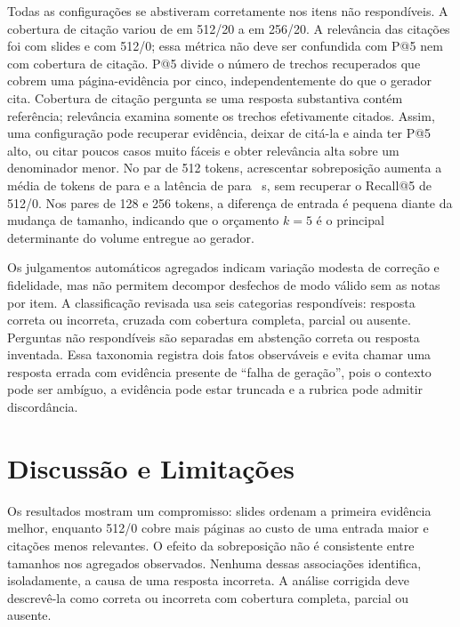 \documentclass[conference]{IEEEtran}
\begin{document}
Todas as configurações se abstiveram corretamente nos \NNaoRespondiveisTeste{} itens não respondíveis.
A cobertura de citação variou de \ComCitacaoCGrdCom{} em 512/20 a \ComCitacaoCMedCom{} em 256/20.
A relevância das citações foi \PrecCitacaoSlide{} com slides e \PrecCitacaoCGrdSem{} com 512/0; essa métrica não deve ser confundida com P@5 nem com cobertura de citação.
P@5 divide o número de trechos recuperados que cobrem uma página-evidência por cinco, independentemente do que o gerador cita.
Cobertura de citação pergunta se uma resposta substantiva contém referência; relevância examina somente os trechos efetivamente citados.
Assim, uma configuração pode recuperar evidência, deixar de citá-la e ainda ter P@5 alto, ou citar poucos casos muito fáceis e obter relevância alta sobre um denominador menor.
No par de 512 tokens, acrescentar sobreposição aumenta a média de tokens de \TokensEntradaCGrdSem{} para \TokensEntradaCGrdCom{} e a latência de \LatenciaGeracaoCGrdSem{} para \LatenciaGeracaoCGrdCom{}~s, sem recuperar o Recall@5 de 512/0.
Nos pares de 128 e 256 tokens, a diferença de entrada é pequena diante da mudança de tamanho, indicando que o orçamento $k=5$ é o principal determinante do volume entregue ao gerador.

Os julgamentos automáticos agregados indicam variação modesta de correção e fidelidade, mas não permitem decompor desfechos de modo válido sem as notas por item.
A classificação revisada usa seis categorias respondíveis: resposta correta ou incorreta, cruzada com cobertura completa, parcial ou ausente.
Perguntas não respondíveis são separadas em abstenção correta ou resposta inventada.
Essa taxonomia registra dois fatos observáveis e evita chamar uma resposta errada com evidência presente de ``falha de geração'', pois o contexto pode ser ambíguo, a evidência pode estar truncada e a rubrica pode admitir discordância.

\section{Discussão e Limitações}
Os resultados mostram um compromisso: slides ordenam a primeira evidência melhor, enquanto 512/0 cobre mais páginas ao custo de uma entrada maior e citações menos relevantes.
O efeito da sobreposição não é consistente entre tamanhos nos agregados observados.
Nenhuma dessas associações identifica, isoladamente, a causa de uma resposta incorreta.
A análise corrigida deve descrevê-la como correta ou incorreta com cobertura completa, parcial ou ausente.
\end{document}
